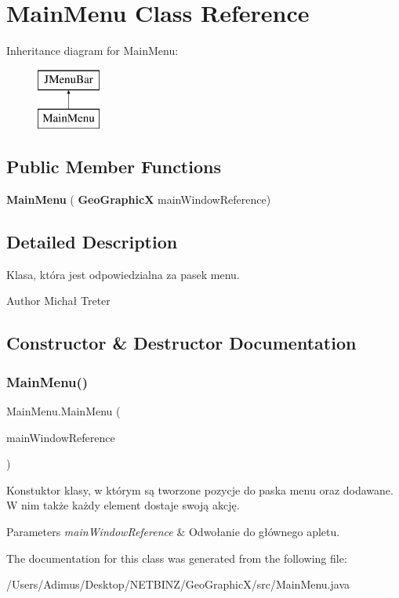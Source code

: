 \section{Main\+Menu Class Reference}
\label{class_main_menu}
Inheritance diagram for Main\+Menu\+:\begin{figure}[H]
\begin{center}
\leavevmode
\includegraphics[height=2.000000cm]{class_main_menu}
\end{center}
\end{figure}
\subsection*{Public Member Functions}
\begin{DoxyCompactItemize}
\item 
\textbf{ Main\+Menu} (\textbf{ Geo\+GraphicX} main\+Window\+Reference)
\end{DoxyCompactItemize}


\subsection{Detailed Description}
Klasa, która jest odpowiedzialna za pasek menu. \begin{DoxyAuthor}{Author}
Michał Treter 
\end{DoxyAuthor}


\subsection{Constructor \& Destructor Documentation}
\mbox{\label{class_main_menu_a95fdb1f3b86e3ef7ecc382534ff644b7}} 
\subsubsection{Main\+Menu()}
{\footnotesize\ttfamily Main\+Menu.\+Main\+Menu (\begin{DoxyParamCaption}\item[{\textbf{ Geo\+GraphicX}}]{main\+Window\+Reference }\end{DoxyParamCaption})}

Konstuktor klasy, w którym są tworzone pozycje do paska menu oraz dodawane. W nim także każdy element dostaje swoją akcję. 
\begin{DoxyParams}{Parameters}
{\em main\+Window\+Reference} & Odwołanie do głównego apletu. \\
\hline
\end{DoxyParams}


The documentation for this class was generated from the following file\+:\begin{DoxyCompactItemize}
\item 
/\+Users/\+Adimus/\+Desktop/\+N\+E\+T\+B\+I\+N\+Z/\+Geo\+Graphic\+X/src/Main\+Menu.\+java\end{DoxyCompactItemize}
